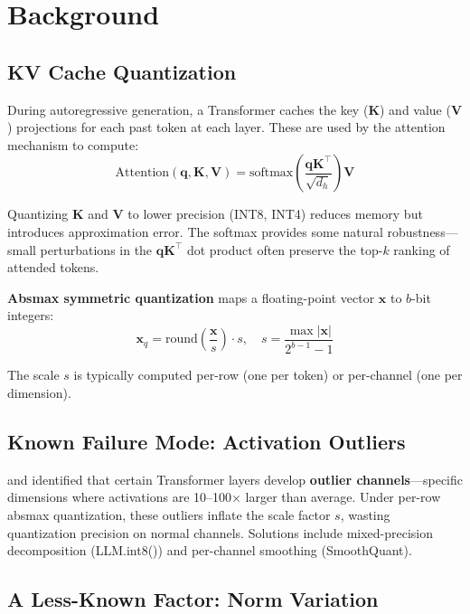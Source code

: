 \documentclass[11pt]{article}
\begin{document}
\section{Background}

\subsection{KV Cache Quantization}

During autoregressive generation, a Transformer caches the key ($\mathbf{K}$) and value ($\mathbf{V}$) projections for each past token at each layer. These are used by the attention mechanism to compute:
\begin{equation}
\text{Attention}(\mathbf{q}, \mathbf{K}, \mathbf{V}) = \text{softmax}\!\left(\frac{\mathbf{q}\mathbf{K}^\top}{\sqrt{d_h}}\right)\mathbf{V}
\end{equation}

Quantizing $\mathbf{K}$ and $\mathbf{V}$ to lower precision (INT8, INT4) reduces memory but introduces approximation error. The softmax provides some natural robustness---small perturbations in the $\mathbf{qK}^\top$ dot product often preserve the top-$k$ ranking of attended tokens.

\textbf{Absmax symmetric quantization} maps a floating-point vector $\mathbf{x}$ to $b$-bit integers:
\begin{equation}
\mathbf{x}_q = \text{round}\!\left(\frac{\mathbf{x}}{s}\right) \cdot s, \quad s = \frac{\max|\mathbf{x}|}{2^{b-1}-1}
\end{equation}

The scale $s$ is typically computed per-row (one per token) or per-channel (one per dimension).

\subsection{Known Failure Mode: Activation Outliers}

\citet{dettmers2022llm} and \citet{xiao2023smoothquant} identified that certain Transformer layers develop \textbf{outlier channels}---specific dimensions where activations are 10--100$\times$ larger than average. Under per-row absmax quantization, these outliers inflate the scale factor $s$, wasting quantization precision on normal channels. Solutions include mixed-precision decomposition (LLM.int8()) and per-channel smoothing (SmoothQuant).

\subsection{A Less-Known Factor: Norm Variation}
\end{document}
